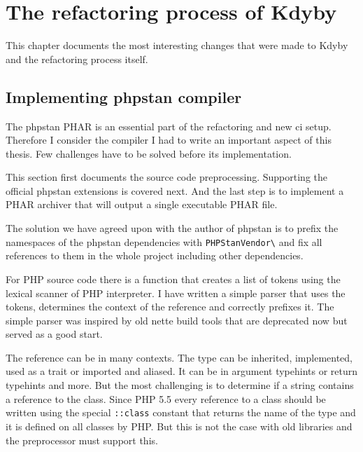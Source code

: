 \chapter{The refactoring process of Kdyby}

This chapter documents the most interesting changes that were made to Kdyby and the refactoring process itself.

\section{Implementing \gls{phpstan} compiler}

The \gls{phpstan} PHAR is an essential part of the refactoring and new \gls{ci} setup. Therefore I consider the compiler I had to write an important aspect of this thesis. Few challenges have to be solved before its implementation.

This section first documents the source code preprocessing. Supporting the official \gls{phpstan} extensions is covered next. And the last step is to implement a PHAR archiver that will output a single executable PHAR file.

 \label{sec:refactoring:phpstan-preprocessor}

The solution we have agreed upon with the author of \gls{phpstan} is to prefix the namespaces of the \gls{phpstan} dependencies with \lstinline{PHPStanVendor\} and fix all references to them in the whole project including other dependencies.

For PHP source code there is a function  that creates a list of tokens using the lexical scanner of PHP interpreter. I have written a simple parser that uses the tokens, determines the context of the reference and correctly prefixes it. The simple parser was inspired by old \gls{nette} build tools that are deprecated now but served as a good start.

The reference can be in many contexts. The type can be inherited, implemented, used as a trait or imported and aliased. It can be in argument typehints or return typehints and more. But the most challenging is to determine if a string contains a reference to the class. Since PHP 5.5 every reference to a class should be written using the special \lstinline{::class} constant that returns the name of the type and it is defined on all classes by PHP. But this is not the case with old libraries and the preprocessor must support this.

